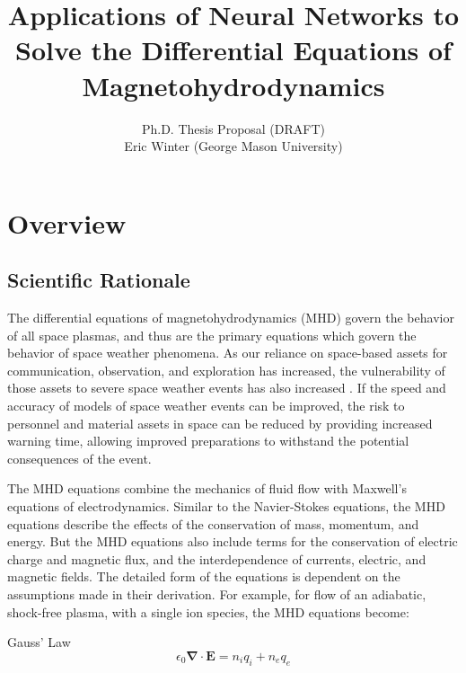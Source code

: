 \documentclass{article}
\title{Applications of Neural Networks to Solve the Differential Equations of Magnetohydrodynamics}
\author{Ph.D. Thesis Proposal (DRAFT)\\Eric Winter (George Mason University)}
\begin{document}
\begin{titlepage}
\maketitle
\end{titlepage}


\tableofcontents


\newpage

\section{Overview}

\subsection{Scientific Rationale}

The differential equations of magnetohydrodynamics (MHD) govern the behavior of all space plasmas, and thus are the primary equations which govern the behavior of space weather phenomena. As our reliance on space-based assets for communication, observation, and exploration has increased, the vulnerability of those assets to severe space weather events has also increased \cite{NRC2009}. If the speed and accuracy of models of space weather events can be improved, the risk to personnel and material assets in space can be reduced by providing increased warning time, allowing improved preparations to withstand the potential consequences of the event.

The MHD equations combine the mechanics of fluid flow with Maxwell's equations of electrodynamics. Similar to the Navier-Stokes equations, the MHD equations describe the effects of the conservation of mass, momentum, and energy. But the MHD equations also include terms for the conservation of electric charge and magnetic flux, and the interdependence of currents, electric, and magnetic fields. The detailed form of the equations is dependent on the assumptions made in their derivation. For example, for flow of an adiabatic, shock-free plasma, with a single ion species, the MHD equations \cite{Chen1984} become:

\bigskip

Gauss' Law
\begin{equation}
    \epsilon_0 \mathbf \nabla \cdotp \mathbf E = n_i q_i + n_e q_e
    \label{eq:GaussLaw}
\end{equation}
\end{document}
